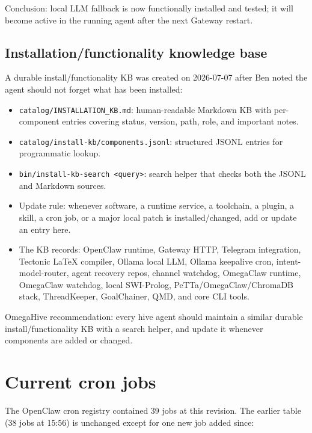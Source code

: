 \documentclass[11pt]{article}
\begin{document}
Conclusion: local LLM fallback is now functionally installed and tested; it will become active in the running agent after the next Gateway restart.

\subsection{Installation/functionality knowledge base}

A durable install/functionality KB was created on 2026-07-07 after Ben noted the agent should not forget what has been installed:
\begin{itemize}
  \item \texttt{catalog/INSTALLATION\_KB.md}: human-readable Markdown KB with per-component entries covering status, version, path, role, and important notes.
  \item \texttt{catalog/install-kb/components.jsonl}: structured JSONL entries for programmatic lookup.
  \item \texttt{bin/install-kb-search <query>}: search helper that checks both the JSONL and Markdown sources.
  \item Update rule: whenever software, a runtime service, a toolchain, a plugin, a skill, a cron job, or a major local patch is installed/changed, add or update an entry here.
  \item The KB records: OpenClaw runtime, Gateway HTTP, Telegram integration, Tectonic LaTeX compiler, Ollama local LLM, Ollama keepalive cron, intent-model-router, agent recovery repos, channel watchdog, OmegaClaw runtime, OmegaClaw watchdog, local SWI-Prolog, PeTTa/OmegaClaw/ChromaDB stack, ThreadKeeper, GoalChainer, QMD, and core CLI tools.
\end{itemize}

OmegaHive recommendation: every hive agent should maintain a similar durable install/functionality KB with a search helper, and update it whenever components are added or changed.

\section{Current cron jobs}

The OpenClaw cron registry contained 39 jobs at this revision.  The earlier table (38 jobs at 15:56) is unchanged except for one new job added since:
\end{document}
